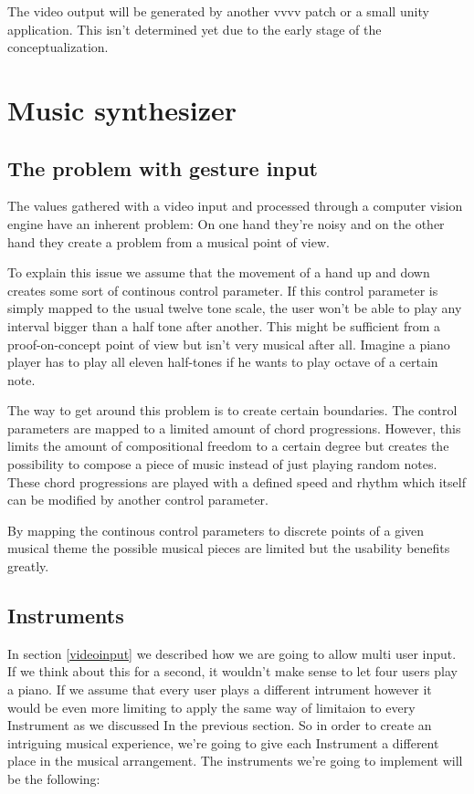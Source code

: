\documentclass[titlepage, a4paper, 11pt]{scrartcl}
\begin{document}
The video output will be generated by another vvvv patch or a small unity application. This isn't determined yet due to the early stage of the conceptualization.

\section{Music synthesizer}

\subsection{The problem with gesture input} \label{gestureinput}

The values gathered with a video input and processed through a computer vision engine have an inherent problem:
On one hand they're noisy and on the other hand they create a problem from a musical point of view.

To explain this issue we assume that the movement of a hand up and down creates some sort of continous control parameter.
If this control parameter is simply mapped to the usual twelve tone scale, the user won't be able to play any
interval bigger than a half tone after another. This might be sufficient from a proof-on-concept point of view but
isn't very musical after all. Imagine a piano player has to play all eleven half-tones if he wants to play octave of a certain note.

The way to get around this problem is to create certain boundaries. The control parameters are mapped to a limited amount
of chord progressions. However, this limits the amount of compositional freedom to a certain degree but creates 
the possibility to compose a piece of music instead of just playing random notes.
These chord progressions are played with a defined speed and rhythm which itself can be modified by another control parameter.

By mapping the continous control parameters to discrete points of a given musical theme the possible musical pieces are limited but the usability benefits greatly.

\subsection{Instruments}


In section \ref{videoinput} we described how we are going to allow multi user input. If we think about this for a second, it wouldn't make sense to
let four users play a piano.  
If we assume that every user plays a different intrument however it would be even more limiting to apply the same way of limitaion to every Instrument as we discussed
In the previous section.
So in order to create an intriguing musical experience, we're going to give each Instrument a different place in the musical arrangement.
The instruments we're going to implement will be the following:
\end{document}
